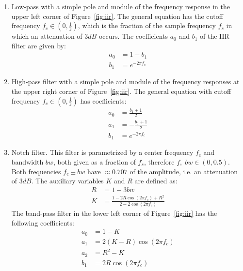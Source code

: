 \begin{enumerate}
  \item Low-pass with a simple pole and module of the frequency response in the upper left corner of Figure~\ref{fig:iir}. The general equation has the cutoff frequency $f_c \in (0,\frac{1}{2})$, which is the fraction of the sample frequency $f_s$ in which an attenuation of $3dB$ occurs. The coefficients $a_0$ and $b_1$ of the IIR filter are given by:
\begin{equation}\label{eq:passa-baixas}
 \begin{split}
 a_0 & =  1-b_1 \\
 b_1 & = e^{-2\pi f_c}
 \end{split}
\end{equation}
  \item High-pass filter with a simple pole and module of the frequency responses at the upper right corner of Figure~\ref{fig:iir}.
	  The general equation with cutoff frequency $f_c \in (0,\frac{1}{2})$ has coefficients:
\begin{equation}\label{eq:passa-altas}
 \begin{split}
 a_0 & =  \frac{b_1+1}{2} \\
 a_1 & =  -\frac{b_1+1}{2} \\
 b_1 & = e^{-2\pi f_c}
 \end{split}
\end{equation}
\item Notch filter. This filter is parametrized by a center frequency $f_c$ and bandwidth $bw$, both given as a fraction of $f_s$, therefore $f,\; bw \in (0,0.5)$. Both frequencies $f_c \pm bw$ have $\approx 0.707$ of the amplitude, i.e. an attenuation of $3dB$. The auxiliary variables $K$ and $R$ are defined as:
\begin{equation}\label{eq:varAux}
 \begin{split}
  R & = 1 - 3bw \\
  K & = \frac{1-2R\cos(2\pi f_c) + R^2}{2 - 2 \cos (2 \pi f_c)}
 \end{split}
\end{equation}
The band-pass filter in the lower left corner of Figure~\ref{fig:iir} has the following coefficients:
\begin{equation}\label{eq:passa-banda}
 \begin{split}
 a_0 & =  1 - K \\
 a_1 & =  2(K-R)\cos (2\pi f_c) \\
 a_2 & =  R^2-K \\
 b_1 & =  2R \cos (2\pi f_c) \\

\end{split}
\end{equation}
\end{enumerate}
